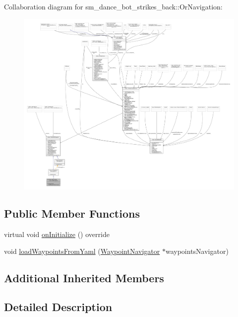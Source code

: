 Collaboration diagram for sm\+\_\+dance\+\_\+bot\+\_\+strikes\+\_\+back\+:\+:Or\+Navigation\+:
\nopagebreak
\begin{figure}[H]
\begin{center}
\leavevmode
\includegraphics[width=350pt]{classsm__dance__bot__strikes__back_1_1OrNavigation__coll__graph}
\end{center}
\end{figure}
\subsection*{Public Member Functions}
\begin{DoxyCompactItemize}
\item 
virtual void \hyperlink{classsm__dance__bot__strikes__back_1_1OrNavigation_a458a0c5fed04b9906c6943f1e7ac5bf0}{on\+Initialize} () override
\item 
void \hyperlink{classsm__dance__bot__strikes__back_1_1OrNavigation_abd8811831075be61ad28fe4a68fc738d}{load\+Waypoints\+From\+Yaml} (\hyperlink{classmove__base__z__client_1_1WaypointNavigator}{Waypoint\+Navigator} $\ast$waypoints\+Navigator)
\end{DoxyCompactItemize}
\subsection*{Additional Inherited Members}


\subsection{Detailed Description}


